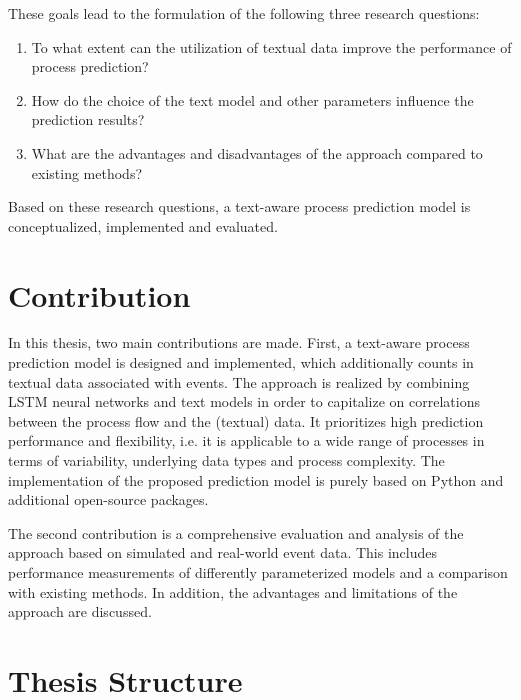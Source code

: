 These goals lead to the formulation of the following three research questions:

\begin{enumerate}
	\item To what extent can the utilization of textual data improve the performance of process prediction?
	\item How do the choice of the text model and other parameters influence the prediction results?
	\item What are the advantages and disadvantages of the approach compared to existing methods?
\end{enumerate}

Based on these research questions, a text-aware process prediction model is conceptualized, implemented and evaluated.

\section{Contribution}

In this thesis, two main contributions are made.
First, a text-aware process prediction model is designed and implemented, which additionally counts in textual data associated with events.
The approach is realized by combining LSTM neural networks and text models in order to capitalize on correlations between the process flow and the (textual) data.
It prioritizes high prediction performance and flexibility, i.e. it is applicable to a wide range of processes in terms of variability, underlying data types and process complexity.
The implementation of the proposed prediction model is purely based on Python and additional open-source packages.

The second contribution is a comprehensive evaluation and analysis of the approach based on simulated and real-world event data.
This includes performance measurements of differently parameterized models and a comparison with existing methods.
In addition, the advantages and limitations of the approach are discussed.

\section{Thesis Structure}

